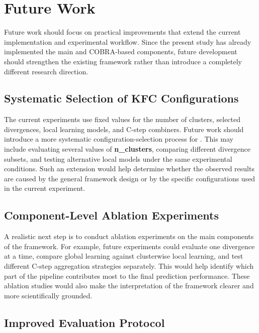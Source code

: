\section{Future Work}
\label{sec:future_work}

\hs Future work should focus on practical improvements that extend the current implementation and experimental workflow. Since the present study has already implemented the main \KFCProcedure{} and COBRA-based components, future development should strengthen the existing framework rather than introduce a completely different research direction.

\subsection{Systematic Selection of KFC Configurations}

\hs The current experiments use fixed values for the number of clusters, selected divergences, local learning models, and C-step combiners. Future work should introduce a more systematic configuration-selection process for \KFCProcedure{}. This may include evaluating several values of \textbf{n\_clusters}, comparing different divergence subsets, and testing alternative local models under the same experimental conditions. Such an extension would help determine whether the observed results are caused by the general framework design or by the specific configurations used in the current experiment.

\subsection{Component-Level Ablation Experiments}

\hs A realistic next step is to conduct ablation experiments on the main components of the framework. For example, future experiments could evaluate one divergence at a time, compare global learning against clusterwise local learning, and test different C-step aggregation strategies separately. This would help identify which part of the \KFCProcedure{} pipeline contributes most to the final prediction performance. These ablation studies would also make the interpretation of the framework clearer and more scientifically grounded.

\subsection{Improved Evaluation Protocol}

